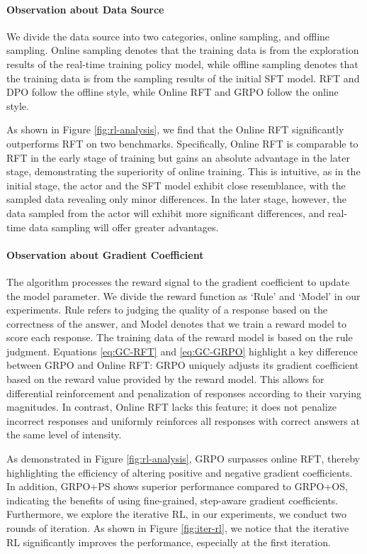 \paragraph{Observation about Data Source} 
We divide the data source into two categories, online sampling, and offline sampling.
Online sampling denotes that the training data is from the exploration results of the real-time training policy model, while offline sampling denotes that the training data is from the sampling results of the initial SFT model.
RFT and DPO follow the offline style, while Online RFT and GRPO follow the online style. 

As shown in Figure \ref{fig:rl-analysis},
we find that the Online RFT significantly outperforms RFT on two benchmarks.
Specifically, Online RFT is comparable to RFT in the early stage of training but gains an absolute advantage in the later stage, demonstrating the superiority of online training. 
This is intuitive, as in the initial stage, the actor and the SFT model exhibit close resemblance, with the sampled data revealing only minor differences. In the later stage, however, the data sampled from the actor will exhibit more significant differences, and real-time data sampling will offer greater advantages.

\paragraph{Observation about Gradient Coefficient}
The algorithm processes the reward signal to the gradient coefficient to update the model parameter.
We divide the reward function as `Rule' and `Model' in our experiments.
Rule refers to judging the quality of a response based on the correctness of the answer, and Model denotes that we train a reward model to score each response. The training data of the reward model is based on the rule judgment.
Equations \ref{eq:GC-RFT} and \ref{eq:GC-GRPO} highlight a key difference between GRPO and Online RFT: GRPO uniquely adjusts its gradient coefficient based on the reward value provided by the reward model. This allows for differential reinforcement and penalization of responses according to their varying magnitudes. In contrast, Online RFT lacks this feature; it does not penalize incorrect responses and uniformly reinforces all responses with correct answers at the same level of intensity. 

As demonstrated in Figure \ref{fig:rl-analysis}, GRPO surpasses online RFT, thereby highlighting the efficiency of altering positive and negative gradient coefficients. In addition, GRPO+PS shows superior performance compared to GRPO+OS, indicating the benefits of using fine-grained, step-aware gradient coefficients.
Furthermore, we explore the iterative RL, in our experiments, we conduct two rounds of iteration. As shown in Figure \ref{fig:iter-rl}, we notice that the iterative RL significantly improves the performance, especially at the first iteration.





